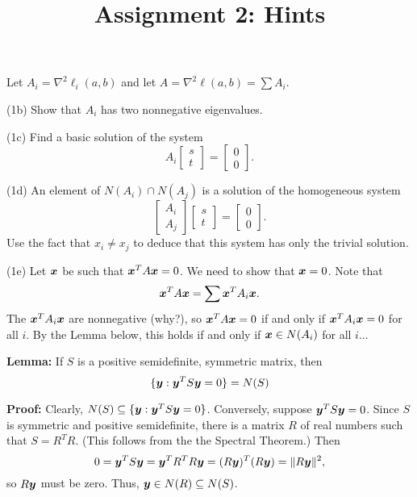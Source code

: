 \documentclass[12pt]{amsart}
\begin{document}
    \title{Assignment 2: Hints}
    \maketitle

        Let $A_i=\nabla^2\ell_i(a, b)$ and let $A=\nabla^2\ell(a, b)=\sum A_i$.

        (1b) Show that $A_i$ has two nonnegative eigenvalues.

        (1c) Find a basic solution of the system
        \[
            A_i\begin{bmatrix}
                s\\t
            \end{bmatrix}=\begin{bmatrix}
                0\\0
            \end{bmatrix}.
        \]

        (1d) An element of $N(A_i)\cap N(A_j)$ is a solution of the homogeneous system
        \[
            \begin{bmatrix}
                A_i\\A_j
            \end{bmatrix}\begin{bmatrix}
                s\\t
            \end{bmatrix}=\begin{bmatrix}
                0\\0
            \end{bmatrix}.
        \]
        Use the fact that $x_i\neq x_j$ to deduce that this system has only the trivial solution.

        (1e) Let $\boldsymbol{x}$ be such that $\boldsymbol{x}^TA\boldsymbol{x}=0$.
        We need to show that $\boldsymbol{x}=0$. Note that
        \[
            \boldsymbol{x}^T A\boldsymbol{x} = \sum\boldsymbol{x}^TA_i\boldsymbol{x}.
        \]
        The $\boldsymbol{x}^TA_i\boldsymbol{x}$ are nonnegative (why?), so $\boldsymbol{x}^TA\boldsymbol{x}=0$ if and only if $\boldsymbol{x}^T A_i\boldsymbol{x}=0$ for all $i$.
        By the Lemma below, this holds if and only if $\boldsymbol{x}\in N(A_i)$ for all $i$...


        \textbf{Lemma:} If $S$ is a positive semidefinite, symmetric matrix, then
        \[
            \{\boldsymbol{y} : \boldsymbol{y}^TS\boldsymbol{y}=0\}=N(S)
        \]

        \textbf{Proof:} Clearly, $N(S)\subseteq\{\boldsymbol{y} : \boldsymbol{y}^TS\boldsymbol{y}=0\}$.
        Conversely, suppose $\boldsymbol{y}^TS\boldsymbol{y}=0$.
        Since $S$ is symmetric and positive semidefinite, there is a 
        matrix $R$ of real numbers such that $S = R^TR$.
        (This follows from the the Spectral Theorem.) Then
        \[
            0=\boldsymbol{y}^TS\boldsymbol{y} = \boldsymbol{y}^TR^TR\boldsymbol{y} = (R\boldsymbol{y})^T(R\boldsymbol{y}) = \|R\boldsymbol{y}\|^2,
        \]
        so $R\boldsymbol{y}$ must be zero. Thus, $\boldsymbol{y}\in N(R)\subseteq N(S)$.
\end{document}
